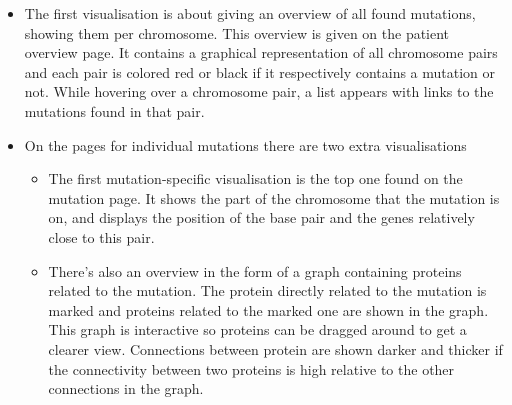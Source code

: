 \begin{itemize}
  \item The first visualisation is about giving an overview of all found mutations, showing them per chromosome. This overview is given on the patient overview page. It contains a graphical representation of all chromosome pairs and each pair is colored red or black if it respectively contains a mutation or not. While hovering over a chromosome pair, a list appears with links to the mutations found in that pair.
  \item On the pages for individual mutations there are two extra visualisations
  \begin{itemize}
     \item The first mutation-specific visualisation is the top one found on the mutation page. It shows the part of the chromosome that the mutation is on, and displays the position of the base pair and the genes relatively close to this pair.
     \item There's also an overview in the form of a graph containing proteins related to the mutation. The protein directly related to the mutation is marked and proteins related to the marked one are shown in the graph. This graph is interactive so proteins can be dragged around to get a clearer view. Connections between protein are shown darker and thicker if the connectivity between two proteins is high relative to the other connections in the graph.
  \end{itemize}
\end{itemize}